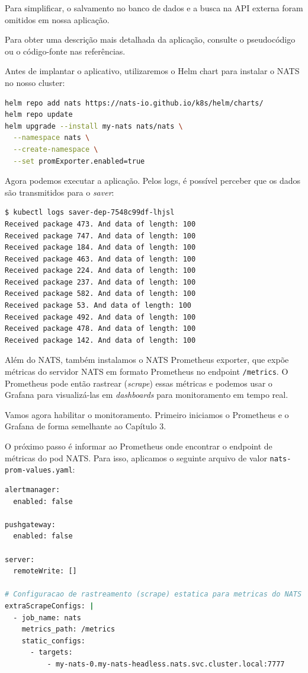 \documentclass[11pt,a4paper]{article}
\begin{document}
Para simplificar, o salvamento no banco de dados e a busca na API externa foram omitidos em nossa aplicação.

Para obter uma descrição mais detalhada da aplicação, consulte o pseudocódigo ou o código-fonte nas referências.

Antes de implantar o aplicativo, utilizaremos o Helm chart para instalar o NATS no nosso cluster:

\begin{lstlisting}[language=bash]
helm repo add nats https://nats-io.github.io/k8s/helm/charts/
helm repo update
helm upgrade --install my-nats nats/nats \
  --namespace nats \
  --create-namespace \
  --set promExporter.enabled=true
\end{lstlisting}

Agora podemos executar a aplicação. Pelos logs, é possível perceber que os dados são transmitidos para o \textit{saver}:

\begin{lstlisting}[language=bash]
$ kubectl logs saver-dep-7548c99df-lhjsl
Received package 473. And data of length: 100
Received package 747. And data of length: 100
Received package 184. And data of length: 100
Received package 463. And data of length: 100
Received package 224. And data of length: 100
Received package 237. And data of length: 100
Received package 582. And data of length: 100
Received package 53. And data of length: 100
Received package 492. And data of length: 100
Received package 478. And data of length: 100
Received package 142. And data of length: 100
\end{lstlisting}

Além do NATS, também instalamos o NATS Prometheus exporter, que expõe métricas do servidor NATS em formato Prometheus no endpoint \texttt{/metrics}. O Prometheus pode então rastrear (\textit{scrape}) essas métricas e podemos usar o Grafana para visualizá-las em \textit{dashboards} para monitoramento em tempo real.

Vamos agora habilitar o monitoramento. Primeiro iniciamos o Prometheus e o Grafana de forma semelhante ao Capítulo 3.

O próximo passo é informar ao Prometheus onde encontrar o endpoint de métricas do pod NATS. Para isso, aplicamos o seguinte arquivo de valor \texttt{nats-prom-values.yaml}:

\begin{lstlisting}[language=bash]
alertmanager:
  enabled: false

pushgateway:
  enabled: false

server:
  remoteWrite: []

# Configuracao de rastreamento (scrape) estatica para metricas do NATS
extraScrapeConfigs: |
  - job_name: nats
    metrics_path: /metrics
    static_configs:
      - targets:
          - my-nats-0.my-nats-headless.nats.svc.cluster.local:7777
\end{lstlisting}
\end{document}
